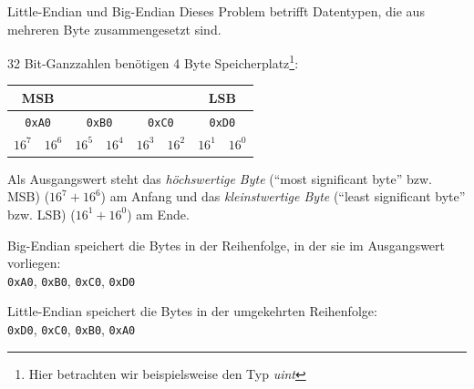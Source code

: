\begin{example}{Little-Endian und Big-Endian}
    Dieses Problem betrifft Datentypen, die aus mehreren Byte zusammengesetzt sind.
    
    32 Bit-Ganzzahlen benötigen 4 Byte Speicherplatz\footnote{Hier betrachten wir beispielsweise den Typ \emph{uint}}:
    
    \begin{center}
        \begin{tabular}{|cc|cc|cc|cc|}
            \multicolumn{2}{c}{\textbf{MSB}}   & \multicolumn{4}{c}{}               & \multicolumn{2}{c}{\textbf{LSB}}                                                                             \\\hline
            \multicolumn{2}{|c}{\texttt{0xA0}} & \multicolumn{2}{|c}{\texttt{0xB0}} & \multicolumn{2}{|c}{\texttt{0xC0}} & \multicolumn{2}{|c|}{\texttt{0xD0}}                                     \\\hline
            $16^7$                             & $16^6$                             & $16^5$                             & $16^4$                              & $16^3$ & $16^2$ & $16^1$ & $16^0$ \\\hline
        \end{tabular}
    \end{center}
    
    Als Ausgangswert steht das \emph{höchswertige Byte} (\enquote{most significant byte} bzw. MSB) ($16^7 + 16^6$) am Anfang und das \emph{kleinstwertige Byte} (\enquote{least significant byte} bzw. LSB) ($16^1 + 16^0$) am Ende.
    
    Big-Endian speichert die Bytes in der Reihenfolge, in der sie im Ausgangswert vorliegen:\\
    \texttt{0xA0}, \texttt{0xB0}, \texttt{0xC0}, \texttt{0xD0}
    
    Little-Endian speichert die Bytes in der umgekehrten Reihenfolge:\\
    \texttt{0xD0}, \texttt{0xC0}, \texttt{0xB0}, \texttt{0xA0}
\end{example}

